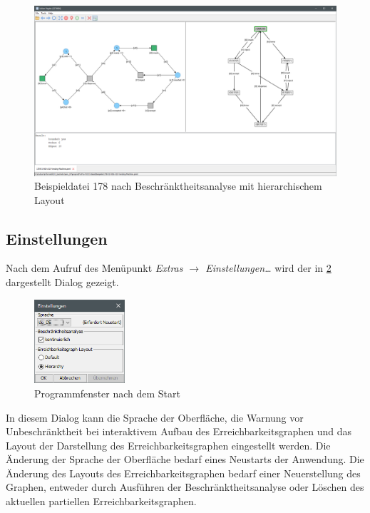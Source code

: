 \begin{figure}[ht!]
  \centering
  \includegraphics[width=\textwidth]{../img/Screenshot_178_hierarchy_layout.png}
  \caption{Beispieldatei 178 nach Beschränktheitsanalyse mit hierarchischem Layout}
  \label{img:ex178_hierarchy}
\end{figure}

\subsection{Einstellungen}
\label{sec:settings}
Nach dem Aufruf des Menüpunkt \emph{Extras $\rightarrow$ Einstellungen\ldots}
wird der in \cref{img:settings} dargestellt Dialog gezeigt.

\begin{figure}[H]
  \centering
  \includegraphics[width=0.3\textwidth]{../img/settings.png}
  \caption{Programmfenster nach dem Start}
  \label{img:settings}
\end{figure}

In diesem Dialog kann die Sprache der Oberfläche, die Warnung vor
Unbeschränktheit bei interaktivem Aufbau des Erreichbarkeitsgraphen und das
Layout der Darstellung des Erreichbarkeitsgraphen eingestellt werden. Die
Änderung der Sprache der Oberfläche bedarf eines Neustarts der Anwendung. Die
Änderung des Layouts des Erreichbarkeitsgraphen bedarf einer Neuerstellung des
Graphen, entweder durch Ausführen der Beschränktheitsanalyse oder Löschen des
aktuellen partiellen Erreichbarkeitsgraphen.
